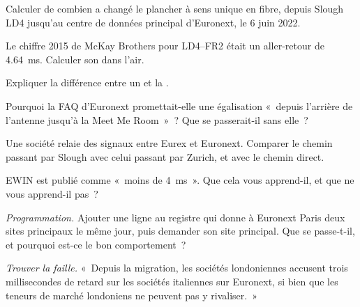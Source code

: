 \begin{exercise}[$\star$]\label{exo:nw:the-european-map:1}
Calculer de combien a changé le plancher à sens unique en fibre, depuis Slough LD4 jusqu'au centre de données principal d'Euronext, le 6 juin 2022.
\end{exercise}

\begin{exercise}[$\star$]\label{exo:nw:the-european-map:2}
Le chiffre 2015 de McKay Brothers pour LD4--FR2 était un aller-retour de \qty{4.64}{\milli\second}. Calculer son  dans l'air.
\end{exercise}

\begin{exercise}[$\star$]\label{exo:nw:the-european-map:3}
Expliquer la différence entre un  et la .
\end{exercise}

\begin{exercise}[$\star\star$]\label{exo:nw:the-european-map:4}
Pourquoi la FAQ d'Euronext promettait-elle une égalisation «~depuis l'arrière de l'antenne jusqu'à la Meet Me Room~»~? Que se passerait-il sans elle~?
\end{exercise}

\begin{exercise}[$\star\star$]\label{exo:nw:the-european-map:5}
Une société relaie des signaux entre Eurex et Euronext. Comparer le chemin passant par Slough avec celui passant par Zurich, et avec le chemin direct.
\end{exercise}

\begin{exercise}[$\star\star$]\label{exo:nw:the-european-map:6}
EWIN est publié comme «~moins de \qty{4}{\milli\second}~». Que cela vous apprend-il, et que ne vous apprend-il pas~?
\end{exercise}

\begin{exercise}[$\star\star\star$]\label{exo:nw:the-european-map:7}
\emph{Programmation.} Ajouter une ligne au registre qui donne à Euronext Paris deux sites principaux le même jour, puis demander son site principal. Que se passe-t-il,
et pourquoi est-ce le bon comportement~?
\end{exercise}

\begin{exercise}[$\star\star\star$]\label{exo:nw:the-european-map:8}
\emph{Trouver la faille.} «~Depuis la migration, les sociétés londoniennes accusent trois millisecondes de retard sur les sociétés italiennes sur Euronext, si bien que les teneurs de marché londoniens ne peuvent pas y rivaliser.~»

\end{exercise}


